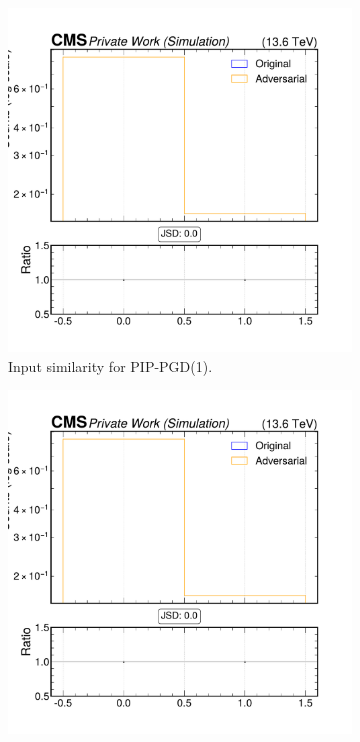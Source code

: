 \begin{figure}[h]
  \centering
  \begin{subfigure}[t]{0.32\textwidth}
    \includegraphics[width=\linewidth]{media/output/features/compare/combined_it_1/cmp_npf_arr_Npfcan_puppiw.pdf}
    \caption*{Input similarity for PIP-PGD(1).}
  \end{subfigure}\hfill
  \begin{subfigure}[t]{0.32\textwidth}
    \includegraphics[width=\linewidth]{media/output/features/compare/combined_it_2/cmp_npf_arr_Npfcan_puppiw.pdf}

\end{subfigure}
\end{figure}
